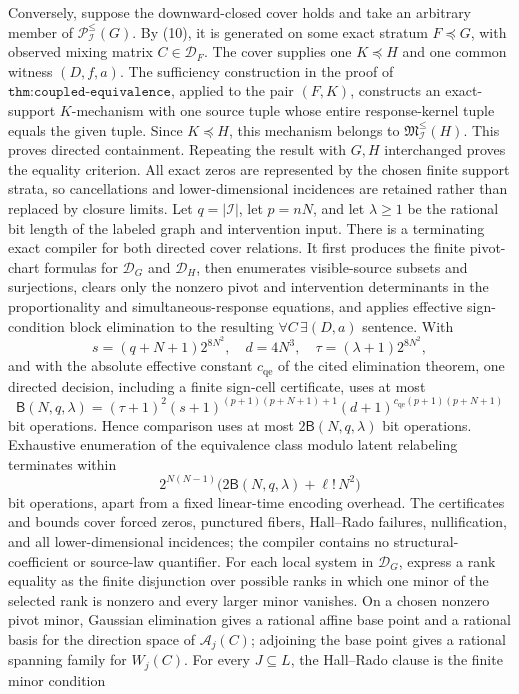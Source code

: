 Conversely, suppose the downward-closed cover holds and take an arbitrary member of \(\mathcal P^{\le}_{\mathcal I}(G)\). By (10), it is generated on some exact stratum \(F\preceq G\), with observed mixing matrix \(C\in\mathcal D_F\). The cover supplies one \(K\preceq H\) and one common witness \((D,f,a)\). The sufficiency construction in the proof of \(\texttt{thm:coupled-equivalence}\), applied to the pair \((F,K)\), constructs an exact-support \(K\)-mechanism with one source tuple whose entire response-kernel tuple equals the given tuple. Since \(K\preceq H\), this mechanism belongs to \(\mathfrak M^{\le}_{\mathcal I}(H)\). This proves directed containment. Repeating the result with \(G,H\) interchanged proves the equality criterion. All exact zeros are represented by the chosen finite support strata, so cancellations and lower-dimensional incidences are retained rather than replaced by closure limits.
Let \(q=|\mathcal I|\), let \(p=nN\), and let \(\lambda\geq1\) be the rational bit length of the labeled graph and intervention input.  There is a terminating exact compiler for both directed cover relations.  It first produces the finite pivot-chart formulas for \(\mathcal D_G\) and \(\mathcal D_H\), then enumerates visible-source subsets and surjections, clears only the nonzero pivot and intervention determinants in the proportionality and simultaneous-response equations, and applies effective sign-condition block elimination to the resulting \(\forall C\,\exists(D,a)\) sentence.  With
\[
s=(q+N+1)2^{8N^2},\quad d=4N^3,\quad \tau=(\lambda+1)2^{8N^2},
\]
and with the absolute effective constant \(c_{\mathrm{qe}}\) of the cited elimination theorem, one directed decision, including a finite sign-cell certificate, uses at most
\[
\mathsf B(N,q,\lambda)
=(\tau+1)^2(s+1)^{(p+1)(p+N+1)+1}
(d+1)^{c_{\mathrm{qe}}(p+1)(p+N+1)}                                   \tag{16}
\]
bit operations.  Hence comparison uses at most \(2\mathsf B(N,q,\lambda)\) bit operations.  Exhaustive enumeration of the equivalence class modulo latent relabeling terminates within
\[
2^{N(N-1)}\bigl(2\mathsf B(N,q,\lambda)+\ell!\,N^2\bigr)               \tag{17}
\]
bit operations, apart from a fixed linear-time encoding overhead.  The certificates and bounds cover forced zeros, punctured fibers, Hall--Rado failures, nullification, and all lower-dimensional incidences; the compiler contains no structural-coefficient or source-law quantifier.
For each local system in \(\mathcal D_G\), express a rank equality as the finite disjunction over possible ranks in which one minor of the selected rank is nonzero and every larger minor vanishes. On a chosen nonzero pivot minor, Gaussian elimination gives a rational affine base point and a rational basis for the direction space of \(\mathcal A_j(C)\); adjoining the base point gives a rational spanning family for \(W_j(C)\). For every \(J\subseteq L\), the Hall--Rado clause is the finite minor condition
